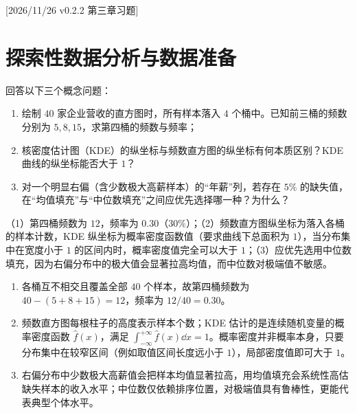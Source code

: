 %
%
[2026/11/26 v0.2.2 第三章习题]
\section{探索性数据分析与数据准备}

\begin{exercise}[title={直方图、核密度图与缺失值填充辨析},level=basic,points=10,tags={直方图,KDE,缺失值}]
回答以下三个概念问题：
\begin{enumerate}
  \item 绘制 $40$ 家企业营收的直方图时，所有样本落入 $4$ 个桶中。已知前三桶的频数分别为 $5, 8, 15$，求第四桶的频数与频率；
  \item 核密度估计图（KDE）的纵坐标与频数直方图的纵坐标有何本质区别？KDE 曲线的纵坐标能否大于 $1$？
  \item 对一个明显右偏（含少数极大高薪样本）的“年薪”列，若存在 $5\%$ 的缺失值，在“均值填充”与“中位数填充”之间应优先选择哪一种？为什么？
\end{enumerate}
\begin{answer}
（1）第四桶频数为 $12$，频率为 $0.30$（$30\%$）；（2）频数直方图纵坐标为落入各桶的样本计数，KDE 纵坐标为概率密度函数值（要求曲线下总面积为 $1$），当分布集中在宽度小于 $1$ 的区间内时，概率密度值完全可以大于 $1$；（3）应优先选用中位数填充，因为右偏分布中的极大值会显著拉高均值，而中位数对极端值不敏感。
\end{answer}
\begin{solution}
\begin{enumerate}
  \item 各桶互不相交且覆盖全部 $40$ 个样本，故第四桶频数为 $40 - (5 + 8 + 15) = 12$，频率为 $12 / 40 = 0.30$。
  \item 频数直方图每根柱子的高度表示样本个数；KDE 估计的是连续随机变量的概率密度函数 $\hat{f}(x)$，满足 $\int_{-\infty}^{+\infty}\hat{f}(x)\dd x = 1$。概率密度并非概率本身，只要分布集中在较窄区间（例如取值区间长度远小于 $1$），局部密度值即可大于 $1$。
  \item 右偏分布中少数极大高薪值会把样本均值显著拉高，用均值填充会系统性高估缺失样本的收入水平；中位数仅依赖排序位置，对极端值具有鲁棒性，更能代表典型个体水平。
\end{enumerate}
\end{solution}
\end{exercise}

